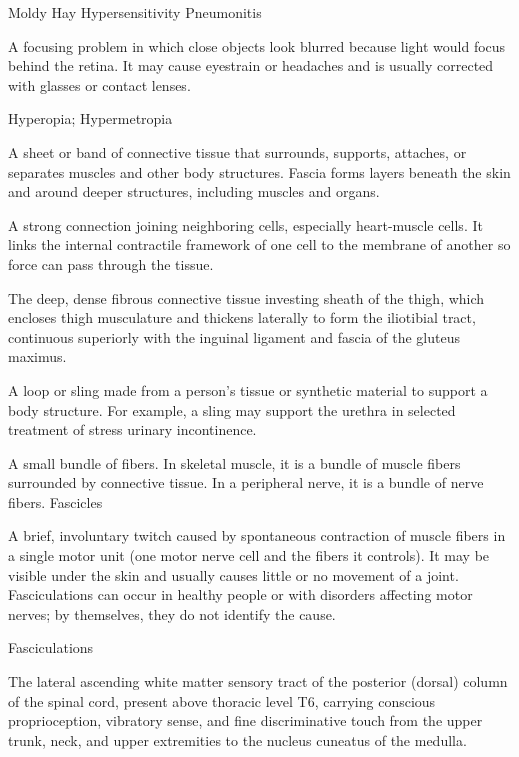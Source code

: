 \synonyms
Moldy Hay Hypersensitivity Pneumonitis

 A focusing problem in which close objects look blurred because light would focus behind the retina. It may cause eyestrain or headaches and is usually corrected with glasses or contact lenses.

\synonyms
Hyperopia; Hypermetropia

 A sheet or band of connective tissue that surrounds, supports, attaches, or separates muscles and other body structures. Fascia forms layers beneath the skin and around deeper structures, including muscles and organs.

 A strong connection joining neighboring cells, especially heart-muscle cells. It links the internal contractile framework of one cell to the membrane of another so force can pass through the tissue.

 The deep, dense fibrous connective tissue investing sheath of the thigh, which encloses thigh musculature and thickens laterally to form the iliotibial tract, continuous superiorly with the inguinal ligament and fascia of the gluteus maximus.

 A loop or sling made from a person’s tissue or synthetic material to support a body structure. For example, a sling may support the urethra in selected treatment of stress urinary incontinence.

 A small bundle of fibers. In skeletal muscle, it is a bundle of muscle fibers surrounded by connective tissue. In a peripheral nerve, it is a bundle of nerve fibers.
\synonyms
Fascicles

 A brief, involuntary twitch caused by spontaneous contraction of muscle fibers in a single motor unit (one motor nerve cell and the fibers it controls). It may be visible under the skin and usually causes little or no movement of a joint. Fasciculations can occur in healthy people or with disorders affecting motor nerves; by themselves, they do not identify the cause.

\synonyms
Fasciculations

 The lateral ascending white matter sensory tract of the posterior (dorsal) column of the spinal cord, present above thoracic level T6, carrying conscious proprioception, vibratory sense, and fine discriminative touch from the upper trunk, neck, and upper extremities to the nucleus cuneatus of the medulla.

